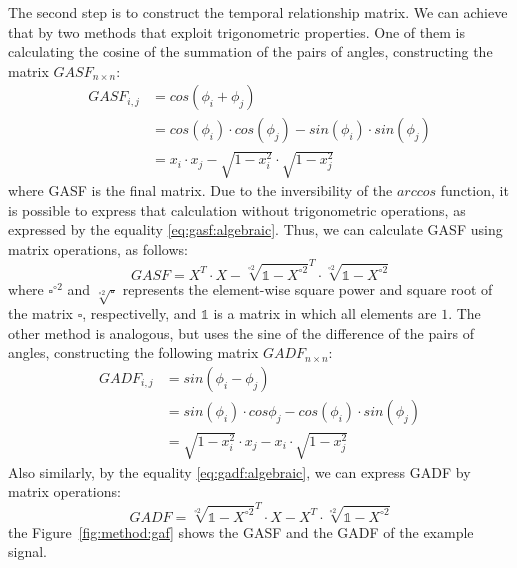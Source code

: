 

The second step is to construct the temporal relationship matrix. We can achieve that by two methods that exploit trigonometric properties. One of them is calculating the cosine of the summation of the pairs of angles, constructing the matrix $GASF_{n \times n}$:
\begin{align}
    GASF_{i,j}     & = cos(\phi_i + \phi_j) \\
            & = cos(\phi_i) \cdot cos(\phi_j) - sin(\phi_i) \cdot sin(\phi_j) \\
            & = x_i \cdot x_j - \sqrt{1 - x_i^2} \cdot \sqrt{1 - x_j^2} \label{eq:gasf:algebraic}
\end{align}
\noindent where \gls{GASF} is the final matrix. Due to the inversibility of the $arccos$ function, it is possible to express that calculation without trigonometric operations, as expressed by the equality \ref{eq:gasf:algebraic}. Thus, we can calculate \gls{GASF} using matrix operations, as follows:  
\begin{equation}
    GASF = X^T \cdot X - \sqrt[\circ 2]{\mathds{1}-X^{\circ 2}}^T \cdot \sqrt[\circ 2]{\mathds{1}-X^{\circ 2}}
\end{equation}
\noindent where $\square^{\circ 2}$ and $\sqrt[\circ 2]{\square}$ represents the element-wise square power and square root of the matrix $\square$, respectivelly, and $\mathds{1}$ is a matrix in which all elements are $1$. The other method is analogous, but uses the sine of the difference of the pairs of angles, constructing the following matrix $GADF_{n \times n}$:
\begin{align}
    GADF_{i,j} & = sin(\phi_i - \phi_j) \\
        & = sin(\phi_i) \cdot cos{\phi_j} - cos(\phi_i) \cdot sin(\phi_j) \\
        & = \sqrt{1 - x_i^2} \cdot x_j - x_i \cdot \sqrt{1 - x_j^2}  \label{eq:gadf:algebraic}
\end{align}
\noindent Also similarly, by the equality \ref{eq:gadf:algebraic}, we can express \gls{GADF} by matrix operations:
\begin{equation}
    GADF = \sqrt[\circ 2]{\mathds{1} - X^{\circ 2}}^T \cdot X - X^T \cdot \sqrt[\circ 2]{\mathds{1} - X^{\circ 2}}
\end{equation}
\noindent the Figure~\ref{fig:method:gaf} shows the \gls{GASF} and the \gls{GADF} of the example signal.



